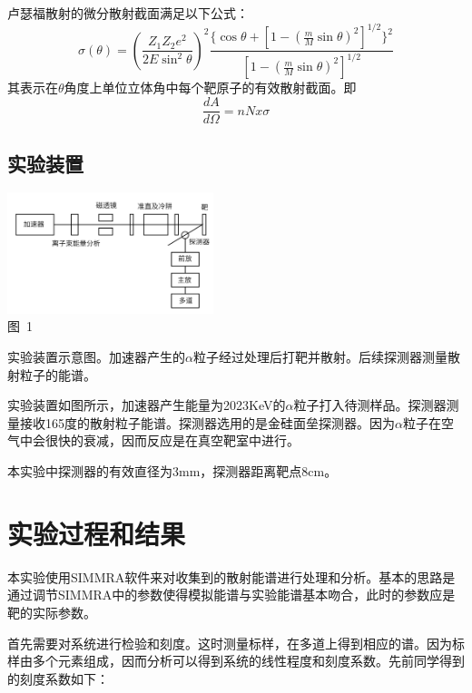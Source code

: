 \documentclass[a4paper,10.0pt,twoside]{npr}
\begin{document}
\begin{multicols}{2}
卢瑟福散射的微分散射截面满足以下公式：
\begin{equation}
	\sigma(\theta)=(\frac{Z_1Z_2e^2}{2E\sin^2\theta})^2\frac{\{\cos\theta+[1-(\frac{m}{M}\sin\theta)^2]^{1/2}\}^2}{[1-(\frac{m}{M}\sin\theta)^2]^{1/2}}
\end{equation}
其表示在$\theta$角度上单位立体角中每个靶原子的有效散射截面。即
\begin{equation}
	\frac{dA}{d\Omega}=nNx\sigma
\end{equation}

\subsection{实验装置}

\begin{center}
   \includegraphics[width=0.45\textwidth]{shiyi.png}
\\
\xiaowu\song 图~1\begin{minipage}[t]{75mm} \quad 实验装置示意图。加速器产生的$\alpha$粒子经过处理后打靶并散射。后续探测器测量散射粒子的能谱。\\[-1mm]\wuhao
\end{minipage}
\end{center}

实验装置如图所示，加速器产生能量为2023KeV的$\alpha$粒子打入待测样品。探测器测量接收165度的散射粒子能谱。探测器选用的是金硅面垒探测器。因为$\alpha$粒子在空气中会很快的衰减，因而反应是在真空靶室中进行。

本实验中探测器的有效直径为3mm，探测器距离靶点8cm。

\section{实验过程和结果}
本实验使用SIMMRA软件来对收集到的散射能谱进行处理和分析。基本的思路是通过调节SIMMRA中的参数使得模拟能谱与实验能谱基本吻合，此时的参数应是靶的实际参数。

首先需要对系统进行检验和刻度。这时测量标样，在多道上得到相应的谱。因为标样由多个元素组成，因而分析可以得到系统的线性程度和刻度系数。先前同学得到的刻度系数如下： 


\end{multicols}
\end{document}
